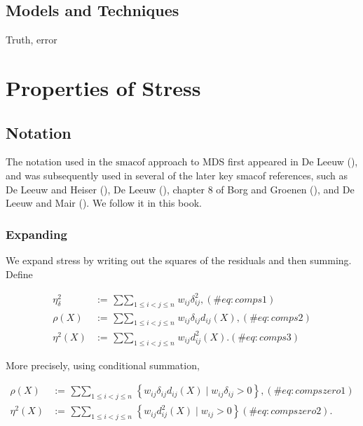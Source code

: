 \documentclass[
  12pt,
  letterpaper,
  DIV=11,
  numbers=noendperiod]{scrreprt}
\theoremstyle{remark}
\begin{document}
\section{Models and Techniques}\label{models-and-techniques}

Truth, error


\chapter{Properties of Stress}\label{propchapter}

\section{Notation}\label{propnotation}

The notation used in the \(\textrm{smacof}\) approach to MDS first
appeared in De Leeuw (), and was
subsequently used in several of the later key smacof references, such as
De Leeuw and Heiser (), De Leeuw
(), chapter 8 of Borg and Groenen
(), and De Leeuw and Mair
(). We follow it in this book.

\subsection{Expanding}\label{propexpand}

We expand stress by writing out the squares of the residuals and then
summing. Define

\begin{align}
\eta_\delta^2&:=\mathop{\sum\sum}_{1\leq i<j\leq n}w_{ij}\delta_{ij}^2,(\#eq:comps1)\\
\rho(X)&:=\mathop{\sum\sum}_{1\leq i<j\leq n}w_{ij}\delta_{ij}d_{ij}(X),(\#eq:comps2)\\
\eta^2(X)&:=\mathop{\sum\sum}_{1\leq i<j\leq n}w_{ij}d_{ij}^2(X).(\#eq:comps3)
\end{align}

More precisely, using conditional summation,

\begin{align}
\rho(X)&:=\mathop{\sum\sum}_{1\leq i<j\leq n}\left\{w_{ij}\delta_{ij}d_{ij}(X)\mid w_{ij}\delta_{ij}>0\right\},(\#eq:compszero1)\\
\eta^2(X)&:=\mathop{\sum\sum}_{1\leq i<j\leq n}\left\{w_{ij}d_{ij}^2(X)\mid w_{ij}>0\right\}(\#eq:compszero2).
\end{align}
\end{document}
